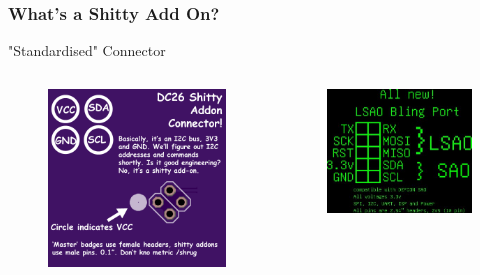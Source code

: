\documentclass[t]{beamer}
\begin{document}
\begin{frame}
\frametitle{What's a Shitty Add On?}
"Standardised" Connector
\begin{columns}[c]
\begin{figure}
\includegraphics[width=0.9\linewidth]{sao.png}
\end{figure}

\begin{figure}
	\includegraphics[width=0.9\linewidth]{LSAO.jpg}
\end{figure}


\end{columns}
\end{frame}
\end{document}
